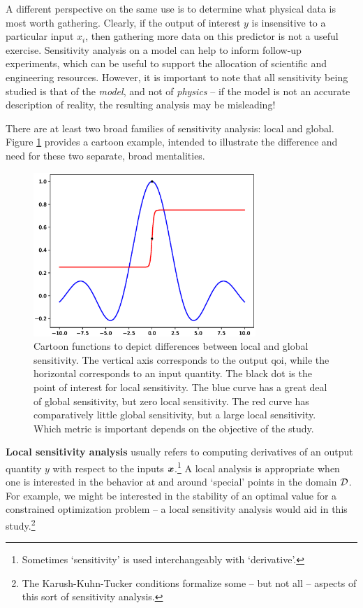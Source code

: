 \documentclass[../primer.tex]{subfiles}
\begin{document}
A different perspective on the same use is to determine what physical data is
most worth gathering. Clearly, if the output of interest $y$ is insensitive to a
particular input $x_i$, then gathering more data on this predictor is not a
useful exercise. Sensitivity analysis on a model can help to inform follow-up
experiments, which can be useful to support the allocation of scientific and
engineering resources. However, it is important to note that all sensitivity
being studied is that of the \emph{model}, and not of \emph{physics} -- if the
model is not an accurate description of reality, the resulting analysis may be
misleading!

There are at least two broad families of sensitivity analysis: local and global.
Figure \ref{fig:local-vs-global} provides a cartoon example, intended to
illustrate the difference and need for these two separate, broad mentalities.

\begin{figure}[!ht]
  \centering\includegraphics[width=0.75\textwidth]{./images/local_vs_global}
  \caption{Cartoon functions to depict differences between local and global
    sensitivity. The vertical axis corresponds to the output qoi, while the
    horizontal corresponds to an input quantity. The black dot is the point of
    interest for local sensitivity. The blue curve has a great deal of global
    sensitivity, but zero local sensitivity. The red curve has comparatively
    little global sensitivity, but a large local sensitivity. Which metric is
    important depends on the objective of the study.}
  \label{fig:local-vs-global}
\end{figure}

\textbf{Local sensitivity analysis} usually refers to computing derivatives of
an output quantity $y$ with respect to the inputs $\boldsymbol{x}$.\footnote{Sometimes
  `sensitivity' is used interchangeably with `derivative'.} A local analysis is
appropriate when one is interested in the behavior at and around `special'
points in the domain $\mathcal{D}$. For example, we might be interested in the stability
of an optimal value for a constrained optimization problem -- a local
sensitivity analysis would aid in this study.\footnote{The Karush-Kuhn-Tucker
  conditions formalize some -- but not all -- aspects of this sort of
  sensitivity analysis.\cite{boyd2004convex}}
\end{document}

